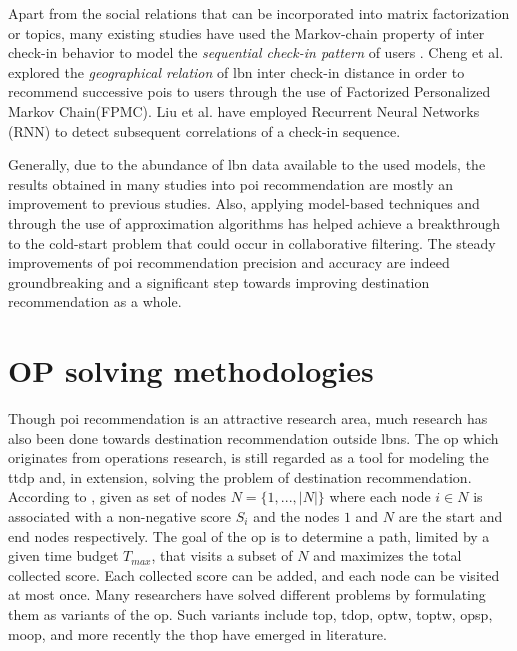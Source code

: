 Apart from the social relations that can be incorporated into matrix factorization or topics, many existing studies have used the Markov-chain property of inter check-in behavior to model the \textit{sequential check-in pattern} of users \parencite{Cheng2013WhereRecommendation, Zhao2016STELLAR:Recommendation, Yang2013ASystem}. Cheng et al. \parencite{Cheng2013WhereRecommendation} explored the \textit{geographical relation} of \gls{lbn} inter check-in distance in order to recommend successive \glspl{poi} to users through the use of Factorized Personalized Markov Chain(FPMC). Liu et al. \parencite{Liu2016PredictingContexts} have employed Recurrent Neural Networks (RNN) to detect subsequent correlations of a check-in sequence. 

Generally, due to the abundance of \gls{lbn} data available to the used models, the results obtained in many studies into \gls{poi} recommendation are mostly an improvement to previous studies. Also,  applying model-based techniques and through the use of approximation algorithms has helped achieve a breakthrough to the cold-start problem that could occur in collaborative filtering. The steady improvements of \gls{poi} recommendation precision and accuracy are indeed groundbreaking and a significant step towards improving destination recommendation as a whole. 


\section{OP solving methodologies}
Though \gls{poi} recommendation is an attractive research area, much research has also been done towards destination recommendation outside \glspl{lbn}. The \Gls{op} which originates from operations research, is still regarded as a tool for modeling the \gls{ttdp} and, in extension, solving the problem of destination recommendation. According to \parencite{Vansteenwegen2011TheSurvey}, given as set of nodes $N = \{1,...,|N|\}$ where each node $i \in N$ is associated with a non-negative score $S_i$ and the nodes $1$ and $N$ are the start and end nodes respectively. The goal of the \gls{op} is to determine a path, limited by a given time budget $T_{max}$, that visits a subset of $N$ and maximizes the total collected score. Each collected score can be added, and each node can be visited at most once. Many researchers have solved different problems by formulating them as variants of the \gls{op}. Such variants include \gls{top}, \gls{tdop}, \gls{optw}, \gls{toptw}, \gls{opsp}, \gls{moop}, and more recently the \gls{thop} have emerged in literature. 

